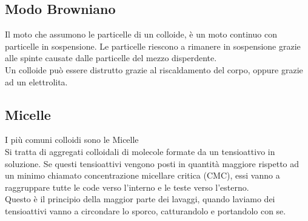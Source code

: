 \subsection{Modo Browniano}
Il moto che assumono le particelle di un colloide, è un moto continuo con particelle in sospensione. Le particelle riescono a rimanere in sospensione grazie alle spinte causate dalle particelle del mezzo disperdente.\\
Un colloide può essere distrutto grazie al riscaldamento del corpo, oppure grazie ad un elettrolita.
\subsection{Micelle}
I più comuni colloidi sono le Micelle\\
Si tratta di aggregati colloidali di molecole formate da un tensioattivo in soluzione. Se questi tensioattivi vengono posti in quantità maggiore rispetto ad un minimo chiamato concentrazione micellare critica (CMC), essi vanno a raggruppare tutte le code verso l’interno e le teste verso l’esterno.\\
Questo è il principio della maggior parte dei lavaggi, quando laviamo dei tensioattivi vanno a circondare lo sporco, catturandolo e portandolo con se. 